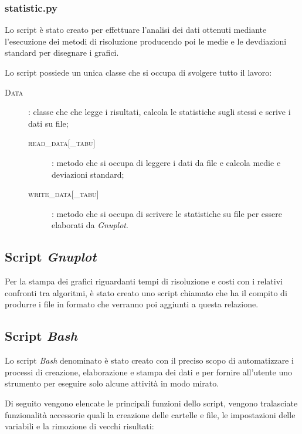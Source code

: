 \subsubsection{statistic.py}
Lo script  è stato creato per effettuare l'analisi dei dati ottenuti mediante l'esecuzione dei metodi di risoluzione producendo poi le medie e le devdiazioni standard per disegnare i grafici.

Lo script possiede un unica classe che si occupa di svolgere tutto il lavoro:
\begin{description}
	\item[\textsc{Data}]: classe che che legge i risultati, calcola le statistiche sugli stessi e scrive i dati su file;
	\begin{description}
		\item[\textsc{read\_data[\_tabu]}]: metodo che si occupa di leggere i dati da file e calcola medie e deviazioni standard;
		\item[\textsc{write\_data[\_tabu]}]: metodo che si occupa di scrivere le statistiche su file per essere elaborati da \emph{Gnuplot}.
	\end{description}
\end{description}

\subsection{Script \emph{Gnuplot}}
Per la stampa dei grafici riguardanti tempi di risoluzione e costi con i relativi confronti tra algoritmi, è stato creato uno script chiamato  che ha il compito di produrre i file in formato  che verranno poi aggiunti a questa relazione.

\subsection{Script \emph{Bash}}
\label{sec:bash}
Lo script \emph{Bash} denominato  è stato creato con il preciso scopo di automatizzare i processi di creazione, elaborazione e stampa dei dati e per fornire all'utente uno strumento per eseguire solo alcune attività in modo mirato.

Di seguito vengono elencate le principali funzioni dello script, vengono tralasciate funzionalità accessorie quali la creazione delle cartelle e file, le impostazioni delle variabili e la rimozione di vecchi risultati:

